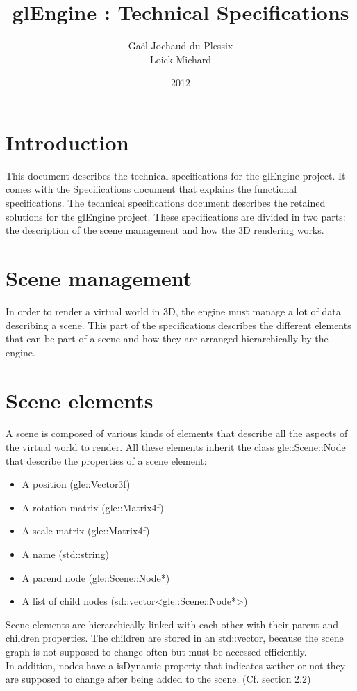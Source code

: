 \documentclass [a4 paper,11pt]{report}
\title {glEngine : Technical Specifications}
\author {Gaël Jochaud du Plessix\\
Loick Michard}
\date {2012}
\begin{document}
\maketitle

\newpage

\tableofcontents

\newpage

\chapter{Introduction}
This document describes the technical specifications for the glEngine project. It comes with the Specifications document that explains the functional specifications. The technical specifications document describes the retained solutions for the glEngine project. These specifications are divided in two parts: the description of the scene management and how the 3D rendering works.

\chapter{Scene management}
In order to render a virtual world in 3D, the engine must manage a lot of data describing a scene. This part of the specifications describes the different elements that can be part of a scene and how they are arranged hierarchically by the engine.

\chapter{Scene elements}
A scene is composed of various kinds of elements that describe all the aspects of the virtual world to render.
All these elements inherit the class gle::Scene::Node that describe the properties of a scene element:
\begin{itemize}
\item A position (gle::Vector3f)
\item A rotation matrix (gle::Matrix4f)
\item A scale matrix (gle::Matrix4f)
\item A name (std::string)
\item A parend node (gle::Scene::Node*)
\item A list of child nodes (sd::vector<gle::Scene::Node*>)
\end{itemize}
Scene elements are hierarchically linked with each other with their parent and children properties. The children are stored in an std::vector, because the scene graph is not supposed to change often but must be accessed efficiently.\\
In addition, nodes have a isDynamic property that indicates wether or not they are supposed to change after being added to the scene. (Cf. section 2.2)
\end{document}
